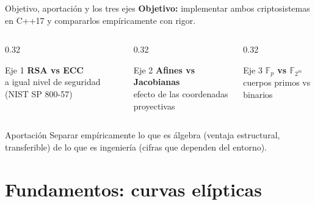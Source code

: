 \documentclass[aspectratio=169,11pt]{beamer}
\begin{document}
\begin{frame}{Objetivo, aportación y los tres ejes}
  \textbf{Objetivo:} implementar ambos criptosistemas en C++17 y compararlos
  empíricamente con rigor.
  \vfill
  \begin{columns}[t]
    \begin{column}{0.32\textwidth}
      \begin{block}{Eje 1}
        \textbf{RSA vs ECC} \\ a igual nivel de seguridad (NIST SP 800-57)
      \end{block}
    \end{column}
    \begin{column}{0.32\textwidth}
      \begin{block}{Eje 2}
        \textbf{Afines vs Jacobianas} \\ efecto de las coordenadas proyectivas
      \end{block}
    \end{column}
    \begin{column}{0.32\textwidth}
      \begin{block}{Eje 3}
        \textbf{$\mathbb{F}_p$ vs $\mathbb{F}_{2^m}$} \\ cuerpos primos vs binarios
      \end{block}
    \end{column}
  \end{columns}
  \vfill
  \begin{alertblock}{Aportación}
    \small Separar empíricamente lo que es \alert{álgebra} (ventaja estructural,
    transferible) de lo que es \alert{ingeniería} (cifras que dependen del entorno).
  \end{alertblock}
\end{frame}

\section{Fundamentos: curvas elípticas}
\end{document}
